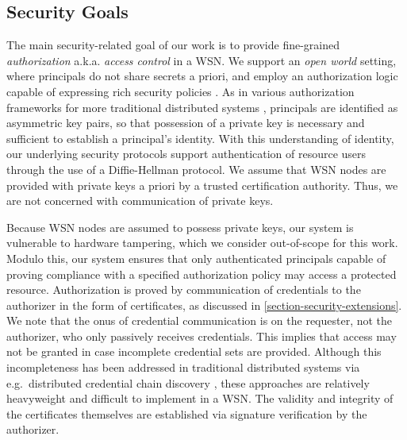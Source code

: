 \subsection{Security Goals}
\label{section-security-model}

The main security-related goal of our work is to provide fine-grained
\emph{authorization} a.k.a. \emph{access control} in a WSN. We support
an \emph{open world} setting, where principals do not share secrets a
priori, and employ an authorization logic capable of expressing rich
security policies \cite{Li:DRBTMF}. As in various authorization
frameworks for more traditional distributed systems \cite{RFC-2693},
principals are identified as asymmetric key pairs, so that possession of
a private key is necessary and sufficient to establish a principal's
identity. With this understanding of identity, our underlying security
protocols support authentication of resource users through the use of a
Diffie-Hellman protocol. We assume that WSN nodes are provided with
private keys a priori by a trusted certification authority. Thus, we are
not concerned with communication of private keys.

Because WSN nodes are assumed to possess private keys, our system is
vulnerable to hardware tampering, which we consider out-of-scope for
this work. Modulo this, our system ensures that only authenticated
principals capable of proving compliance with a specified
authorization policy may access a protected resource. Authorization is
proved by communication of credentials to the authorizer in the form
of certificates, as discussed in
\autoref{section-security-extensions}. We note that the onus of
credential communication is on the requester, not the authorizer, who
only passively receives credentials. This implies that access may not
be granted in case incomplete credential sets are provided. Although
this incompleteness has been addressed in traditional distributed
systems via e.g.~distributed credential chain discovery
\cite{chapin-skalka-wang-acmcs08}, these approaches are relatively
heavyweight and difficult to implement in a WSN. The validity and
integrity of the certificates themselves are established via signature
verification by the authorizer.

